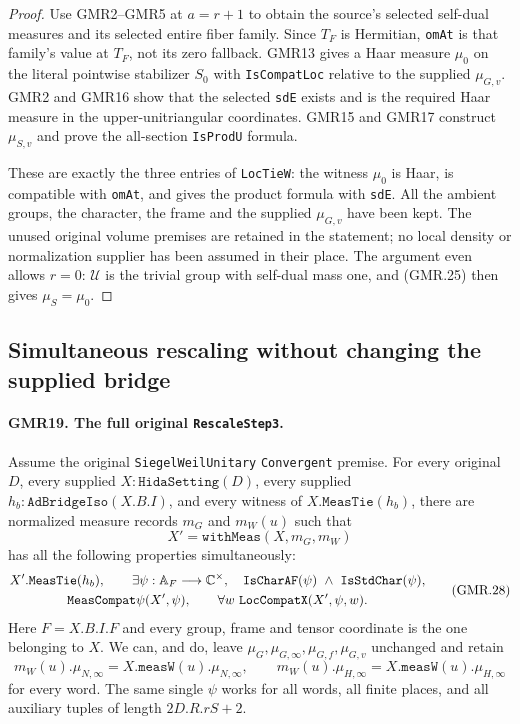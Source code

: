 \begin{proof}
Use GMR2--GMR5 at $a=r+1$ to obtain the source's selected self-dual
measures and its selected entire fiber family.  Since $T_F$ is
Hermitian, \texttt{omAt} is that family's value at $T_F$, not its
zero fallback.  GMR13 gives a Haar measure $\mu_0$ on the literal
pointwise stabilizer $S_0$ with \texttt{IsCompatLoc} relative to the
supplied $\mu_{G,v}$.  GMR2 and GMR16 show that the selected
\texttt{sdE} exists and is the required Haar measure in the
upper-unitriangular coordinates.  GMR15 and GMR17 construct $\mu_{S,v}$
and prove the all-section \texttt{IsProdU} formula.

These are exactly the three entries of \texttt{LocTieW}: the witness
$\mu_0$ is Haar, is compatible with \texttt{omAt}, and gives the
product formula with \texttt{sdE}.  All the ambient groups, the
character, the frame and the supplied $\mu_{G,v}$ have been kept.
The unused original volume premises are retained in the statement;
no local density or normalization supplier has been assumed in their
place.  The argument even allows $r=0$: $\mathcal U$ is the trivial
group with self-dual mass one, and (GMR.25) then gives
$\mu_S=\mu_0$.
\end{proof}

\subsection{Simultaneous rescaling without changing the supplied bridge}

\paragraph{GMR19. The full original \texttt{RescaleStep3}.}
\label{claim:GMR19}
Assume the original \texttt{SiegelWeilUnitary}\allowbreak
\texttt{Convergent} premise.
For every original $D$, every supplied $X:\texttt{HidaSetting}(D)$,
every supplied $h_b:\texttt{AdBridgeIso}(X.B.I)$, and every witness
of $X.\texttt{MeasTie}(h_b)$, there are normalized measure records
$m_G$ and $m_W(u)$ such that
\[
 X'=\texttt{withMeas}(X,m_G,m_W)
 \tag{GMR.27}
\]
has all the following properties simultaneously:
\[
\begin{gathered}
 X'.\texttt{MeasTie}(h_b),\qquad
 \exists\psi:\mathbb A_F\longrightarrow\mathbb C^\times,\quad
 \texttt{IsCharAF}(\psi)\ \wedge\ \texttt{IsStdChar}(\psi),\\
 \texttt{MeasCompat\ensuremath{\psi}}(X',\psi),\qquad
 \forall w\ \texttt{LocCompatX}(X',\psi,w).
\end{gathered}
 \tag{GMR.28}
\]
Here $F=X.B.I.F$ and every group, frame and tensor coordinate is the
one belonging to $X$.  We can, and do, leave
$\mu_G,\mu_{G,\infty},\mu_{G,f},\mu_{G,v}$ unchanged and retain
\[
 m_W(u).\mu_{N,\infty}=X.\texttt{measW}(u).\mu_{N,\infty},\qquad
 m_W(u).\mu_{H,\infty}=X.\texttt{measW}(u).\mu_{H,\infty}
 \tag{GMR.29}
\]
for every word.  The same single $\psi$ works for all words, all
finite places, and all auxiliary tuples of length $2D.R.rS+2$.

